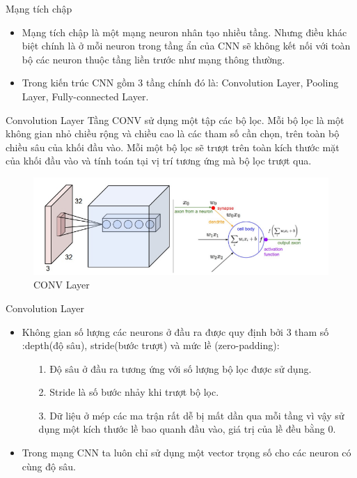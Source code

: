 \documentclass[compress]{beamer}
\begin{document}
\begin{frame}{Mạng tích chập}
\begin{itemize}
\item Mạng tích chập là một mạng neuron nhân tạo nhiều tầng. Nhưng điều khác biệt chính là ở mỗi neuron trong tầng ẩn của CNN sẽ không kết nối với toàn bộ các neuron thuộc tầng liền trước như mạng thông thường.
\item Trong kiến trúc CNN gồm 3 tầng chính đó là: Convolution Layer, Pooling Layer, Fully-connected Layer.
\end{itemize}



\end{frame}
\begin{frame}{Convolution Layer}
Tầng CONV sử dụng một tập các bộ lọc. Mỗi bộ lọc là một không gian nhỏ chiều rộng và chiều cao là các tham số cần chọn, trên toàn bộ chiều sâu của khối đầu vào. Mỗi một bộ lọc sẽ trượt trên toàn kích thước mặt của khối đầu vào và tính toán tại vị trí tương ứng mà bộ lọc trượt qua.
\begin{figure}[H]
\includegraphics[scale=0.5]{img2.png}
\caption{CONV Layer}
\end{figure}

\end{frame}
\begin{frame}{Convolution Layer}
\begin{itemize}
\item	Không gian số lượng các neurons ở đầu ra được quy định bởi 3 tham số :depth(độ sâu), stride(bước trượt) và mức lề (zero-padding):
\begin{itemize}
\item[1. ] Độ sâu ở đầu ra tương ứng với số lượng bộ lọc được sử dụng.
\item[2. ] Stride là số bước nhảy khi trượt bộ lọc.
\item[3. ] Dữ liệu ở mép các ma trận rất dễ bị mất  dần qua mỗi tầng vì vậy sử dụng một kích thước lề bao quanh đầu vào, giá trị của lề đều bằng 0. 

\end{itemize} 
\item Trong mạng CNN ta luôn chỉ sử dụng một vector trọng số cho các neuron có cùng độ sâu.
\end{itemize}
\end{frame}
\end{document}
